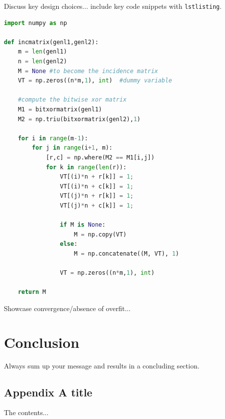 \documentclass[conference,compsoc]{IEEEtran}
\begin{document}
Discuss key design choices... include key code snippets with \texttt{lstlisting}.
\begin{lstlisting}[language=Python]
import numpy as np
    
def incmatrix(genl1,genl2):
    m = len(genl1)
    n = len(genl2)
    M = None #to become the incidence matrix
    VT = np.zeros((n*m,1), int)  #dummy variable
    
    #compute the bitwise xor matrix
    M1 = bitxormatrix(genl1)
    M2 = np.triu(bitxormatrix(genl2),1) 

    for i in range(m-1):
        for j in range(i+1, m):
            [r,c] = np.where(M2 == M1[i,j])
            for k in range(len(r)):
                VT[(i)*n + r[k]] = 1;
                VT[(i)*n + c[k]] = 1;
                VT[(j)*n + r[k]] = 1;
                VT[(j)*n + c[k]] = 1;
                
                if M is None:
                    M = np.copy(VT)
                else:
                    M = np.concatenate((M, VT), 1)
                
                VT = np.zeros((n*m,1), int)
    
    return M
\end{lstlisting}

Showcase convergence/absence of overfit...





\section{Conclusion}
Always sum up your message and results in a concluding section.



%
%
%

\begin{appendices}
\section{Appendix A title}
The contents...

\end{appendices}



\end{document}
